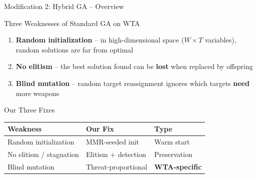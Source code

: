 \documentclass[aspectratio=43,8pt]{beamer}
\begin{document}
\begin{frame}{Modification 2: Hybrid GA -- Overview}
\begin{block}{Three Weaknesses of Standard GA on WTA}
\begin{enumerate}
    \item \textbf{Random initialization} -- in high-dimensional space ($W \times T$ variables), random solutions are far from optimal
    \item \textbf{No elitism} -- the best solution found can be \textbf{lost} when replaced by offspring
    \item \textbf{Blind mutation} -- random target reassignment ignores which targets \textbf{need} more weapons
\end{enumerate}
\end{block}

\vspace{0.3cm}
\begin{alertblock}{Our Three Fixes}
\begin{center}
\begin{tabular}{lll}
\toprule
\textbf{Weakness} & \textbf{Our Fix} & \textbf{Type} \\
\midrule
Random initialization & MMR-seeded init & Warm start \\
No elitism / stagnation & Elitism + detection & Preservation \\
Blind mutation & Threat-proportional & \textbf{WTA-specific} \\
\bottomrule
\end{tabular}
\end{center}
\end{alertblock}
\end{frame}
\end{document}
